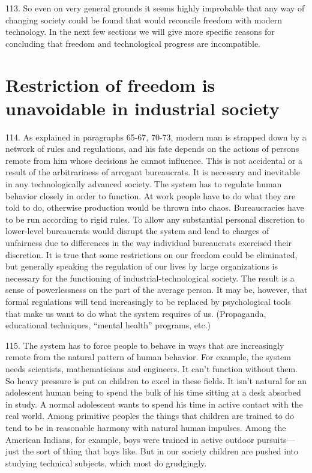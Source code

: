\documentclass{article}
\begin{document}
113.  So even on very general grounds it seems highly improbable that any way of changing society 
could be found that would reconcile freedom with modern technology.  In the next few sections 
we  will  give  more  specific  reasons  for  concluding  that  freedom  and  technological  progress  are  
incompatible. 


\section{Restriction of freedom is unavoidable in industrial society}

\hspace{0.5cm} 114.  As  explained  in  paragraphs  65-67,  70-73,  modern  man  is  strapped  down  by  a  network  of  
rules  and  regulations,  and  his  fate  depends  on  the  actions  of  persons  remote  from  him  whose  
decisions  he  cannot  influence.   This  is  not  accidental  or  a  result  of  the  arbitrariness  of  arrogant  
bureaucrats.  It is necessary and inevitable in any technologically advanced society.  The system 
has to regulate human behavior closely in order to function.  At work people have to do what they 
are told to do, otherwise production would be thrown into chaos.  Bureaucracies have to be run 
according to rigid rules.  To allow any substantial personal discretion to lower-level bureaucrats 
would disrupt the system and lead to charges of unfairness due to differences in the way individual 
bureaucrats  exercised  their  discretion.   It  is  true  that  some  restrictions  on  our  freedom  could  be  
eliminated, but generally speaking the regulation of our lives by large organizations is necessary 
for the functioning of industrial-technological society.  The result is a sense of powerlessness on 
the part of the average person.  It may be, however, that formal regulations will tend increasingly 
to  be  replaced  by  psychological  tools  that  make  us  want  to  do  what  the  system  requires  of  
us.  (Propaganda, educational techniques, “mental health” programs, etc.) \vspace{\baselineskip}

115.  The  system  has  to  force  people  to  behave  in  ways  that  are  increasingly  remote  from  the  
natural pattern of human behavior.  For example, the system needs scientists, mathematicians and 
engineers.  It can’t function without them.  So heavy pressure is put on children to excel in these 
fields.  It isn’t natural for an adolescent human being to spend the bulk of his time sitting at a desk 
absorbed  in  study.   A  normal  adolescent  wants  to  spend  his  time  in  active  contact  with  the  real  
world.  Among primitive peoples the things that children are trained to do tend to be in reasonable 
harmony  with  natural  human  impulses.   Among  the  American  Indians,  for  example,  boys  were  
trained in active outdoor pursuits—just the sort of thing that boys like.  But in our society children 
are pushed into studying technical subjects, which most do grudgingly. \vspace{\baselineskip}
\end{document}
